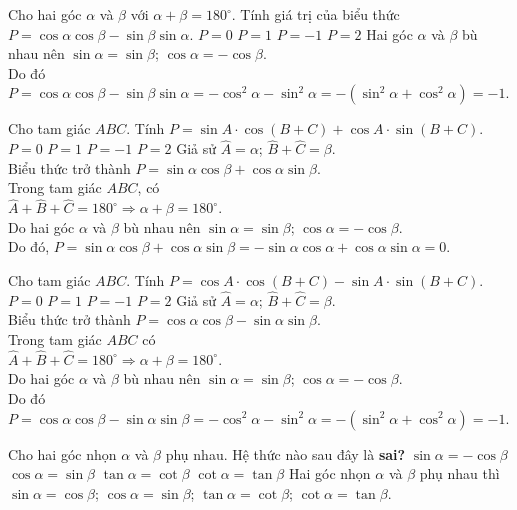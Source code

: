 \begin{ex}%
	Cho hai góc $\alpha $ và $\beta $ với $\alpha +\beta =180^\circ $. Tính giá trị của biểu thức  $P=\cos \alpha \cos \beta -\sin \beta \sin \alpha $.
	\choice
	{$P=0$}
	{$P=1$}
	{\True $P=-1$}
	{$P=2$}
	\loigiai
	{Hai góc $\alpha $ và $\beta $ bù nhau nên $\sin \alpha =\sin \beta $; $\cos \alpha =-\cos \beta $.\\
		Do đó $P=\cos \alpha \cos \beta -\sin \beta \sin \alpha =-\cos^2\alpha -\sin ^2\alpha =-(\sin ^2\alpha +\cos^2\alpha )=-1$.}
\end{ex}
\begin{ex}%
	Cho tam giác $ABC$. Tính $P=\sin A\cdot \cos (B+C )+\cos A\cdot \sin (B+C )$.
	\choice
	{\True $P=0$}
	{$P=1$}
	{$P=-1$}
	{$P=2$}
	\loigiai
	{Giả sử $\widehat{A}=\alpha$; $\widehat{B}+\widehat{C}=\beta $.\\ Biểu thức trở thành $P=\sin \alpha \cos \beta +\cos \alpha \sin \beta $.\\
		Trong tam giác $ABC$, có\\ $\widehat{A}+\widehat{B}+\widehat{C}=180^\circ \Rightarrow \alpha +\beta =180^\circ $.\\
		Do hai góc $\alpha $ và $\beta $ bù nhau nên $\sin \alpha =\sin \beta $; $\cos \alpha =-\cos \beta $.\\
		Do đó, $P=\sin \alpha \cos \beta +\cos \alpha \sin \beta =-\sin \alpha \cos \alpha +\cos \alpha \sin \alpha =0$.}
\end{ex}
\begin{ex}%
	Cho tam giác $ABC$. Tính $P=\cos A\cdot\cos (B+C )-\sin A\cdot\sin (B+C )$.
	\choice
	{$P=0$}
	{$P=1$}
	{\True $P=-1$}
	{$P=2$}
	\loigiai
	{Giả sử $\widehat{A}=\alpha$; $\widehat{B}+\widehat{C}=\beta $.\\ Biểu thức trở thành $P=\cos \alpha \cos \beta -\sin \alpha \sin \beta $.\\
		Trong tam giác $ABC$ có\\ $\widehat{A}+\widehat{B}+\widehat{C}=180^\circ \Rightarrow \alpha +\beta =180^\circ $.\\
		Do hai góc $\alpha $ và $\beta $ bù nhau nên $\sin \alpha =\sin \beta $; $\cos \alpha =-\cos \beta $.\\
		Do đó $P=\cos \alpha \cos \beta -\sin \alpha \sin \beta =-\cos^2\alpha -\sin ^2\alpha =-(\sin ^2\alpha +\cos^2\alpha )=-1$.}
\end{ex}
\begin{ex}%
	Cho hai góc nhọn $\alpha $ và $\beta $ phụ nhau. Hệ thức nào sau đây là \textbf{sai?}
	\choice
	{\True $\sin \alpha =-\cos \beta $}
	{$\cos \alpha =\sin \beta $}
	{$\tan \alpha =\cot \beta $}
	{$\cot \alpha =\tan \beta $}
	\loigiai
	{Hai góc nhọn $\alpha $ và $\beta $ phụ nhau thì $\sin \alpha =\cos \beta$;  $\cos\alpha =\sin\beta$; $\tan\alpha =\cot\beta$; $\cot \alpha =\tan\beta $.}
\end{ex}

